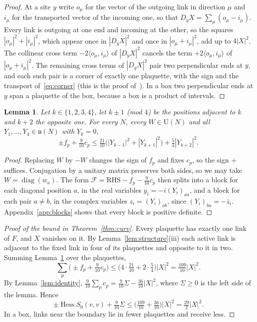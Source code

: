 \documentclass[11pt]{amsart}
\newtheorem{lemma}[theorem]{Lemma}
\theoremstyle{definition}
\theoremstyle{remark}
\numberwithin{equation}{section}
\newcommand{\U}{\mathrm{U}}
\newcommand{\Hess}{\operatorname{Hess}}
\newcommand{\ip}[2]{\langle #1,#2\rangle}
\begin{document}
\begin{proof}
At a site $y$ write $o_\mu$ for the vector of the outgoing link in direction
$\mu$ and $i_\mu$ for the transported vector of the incoming one, so that
$D_yX=\sum_\mu(o_\mu-i_\mu)$. Every link is outgoing at one end and incoming at
the other, so the squares $|o_\mu|^2+|i_\mu|^2$, which appear once in
$|D_yX|^2$ and once in $|o_\mu+i_\mu|^2$, add up to $4|X|^2$. The collinear
cross term $-2\ip{o_\mu}{i_\mu}$ of $|D_yX|^2$ cancels the term
$+2\ip{o_\mu}{i_\mu}$ of $|o_\mu+i_\mu|^2$. The remaining cross terms of
$|D_yX|^2$ pair two perpendicular ends at $y$, and each such pair is a corner
of exactly one plaquette, with the sign and the transport of~\eqref{eq:corner}
(this is the proof of~\cite[Lemma~1]{BB26a}). In a box two perpendicular ends at $y$ span
a plaquette of the box, because a box is a product of intervals.
\end{proof}

\begin{lemma}\label{lem:local}
Let $k\in\{1,2,3,4\}$, let $k\pm1$ \textup{(}mod $4$\textup{)} be the
positions adjacent to $k$ and $k+2$ the opposite one. For every $N$, every
$W\in\U(N)$ and all $Y_1,\dots,Y_4\in\mathfrak u(N)$ with $Y_k=0$,
\[
\pm f_p+\tfrac9{10}c_p\le\tfrac{21}{10}\bigl(|Y_{k-1}|^2+|Y_{k+1}|^2\bigr)
+\tfrac54|Y_{k+2}|^2 .
\]
\end{lemma}

\begin{proof}
Replacing $W$ by $-W$ changes the sign of $f_p$ and fixes $c_p$, so the sign
$+$ suffices. Conjugation by a unitary matrix preserves both sides, so we may
take $W=\operatorname{diag}(w_a)$. The form $\mathcal F=\mathrm{RHS}-f_p-
\frac9{10}c_p$ then splits into a block for each diagonal position $a$, in the
real variables $y_i=-i(Y_i)_{aa}$, and a block for each pair $a\ne b$, in the
complex variables $z_i=(Y_i)_{ab}$, since $(Y_i)_{ba}=-\bar z_i$. Appendix~\ref{app:blocks}
shows that every block is positive definite.
\end{proof}

\begin{proof}[Proof of the bound in Theorem~\ref{thm:curv}]
Every plaquette has exactly one link of $F$, and $X$ vanishes on it. By
Lemma~\ref{lem:structure}(iii) each active link is adjacent to the fixed
link in four of its plaquettes and opposite to it in two. Summing
Lemma~\ref{lem:local} over the plaquettes,
\[
\sum_p\bigl(\pm f_p+\tfrac9{10}c_p\bigr)\le\bigl(4\cdot\tfrac{21}{10}+2\cdot
\tfrac54\bigr)|X|^2=\tfrac{109}{10}|X|^2 .
\]
By Lemma~\ref{lem:identity}, $\frac9{10}\sum_pc_p=\frac9{10}\Sigma-\frac{36}{10}
|X|^2$, where $\Sigma\ge0$ is the left side of the lemma. Hence
\[
\pm\Hess S_0(v,v)+\tfrac9{10}\Sigma\le\bigl(\tfrac{109}{10}+\tfrac{36}{10}\bigr)
|X|^2=\tfrac{29}2|X|^2 .
\]
In a box, links near the boundary lie in fewer plaquettes and receive less.
\end{proof}
\end{document}
